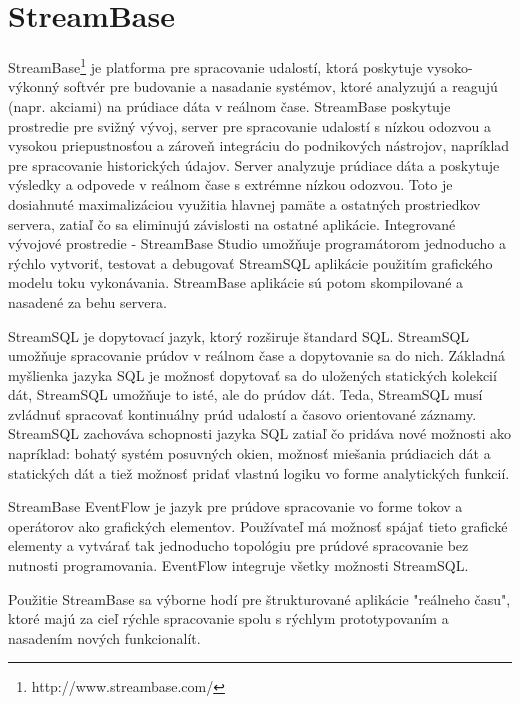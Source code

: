 \section{StreamBase}
StreamBase\footnote{http://www.streambase.com/} je platforma pre spracovanie udalostí, ktorá poskytuje vysoko-výkonný softvér pre budovanie a nasadanie systémov, ktoré analyzujú a reagujú (napr. akciami) na prúdiace dáta v reálnom čase. StreamBase poskytuje prostredie pre svižný vývoj, server pre spracovanie udalostí s nízkou odozvou a vysokou priepustnosťou a zároveň integráciu do podnikových nástrojov, napríklad pre spracovanie historických údajov. Server analyzuje prúdiace dáta a poskytuje výsledky a odpovede v reálnom čase s extrémne nízkou odozvou. Toto je dosiahnuté maximalizáciou využitia hlavnej pamäte a ostatných prostriedkov servera, zatiaľ čo sa eliminujú závislosti na ostatné aplikácie. Integrované vývojové prostredie - StreamBase Studio umožňuje programátorom jednoducho a rýchlo vytvoriť, testovat a debugovať StreamSQL aplikácie použitím grafického modelu toku vykonávania. StreamBase aplikácie sú potom skompilované a nasadené za behu servera.
\par
StreamSQL je dopytovací jazyk, ktorý rozširuje štandard SQL. StreamSQL umožňuje spracovanie prúdov v reálnom čase a dopytovanie sa do nich. Základná myšlienka jazyka SQL je možnosť dopytovať sa do uložených statických kolekcií dát, StreamSQL umožňuje to isté, ale do prúdov dát. Teda, StreamSQL musí zvládnuť spracovať kontinuálny prúd udalostí a časovo orientované záznamy. StreamSQL zachováva schopnosti jazyka SQL zatiaľ čo pridáva nové možnosti ako napríklad: bohatý systém posuvných okien, možnosť miešania prúdiacich dát a statických dát a tiež možnosť pridať vlastnú logiku vo forme analytických funkcií. 
\par
StreamBase EventFlow je jazyk pre prúdove spracovanie vo forme tokov a operátorov ako grafických elementov. Používateľ má možnosť spájať tieto grafické elementy a vytvárať tak jednoducho topológiu pre prúdové spracovanie bez nutnosti programovania. EventFlow integruje všetky možnosti StreamSQL.
\par
Použitie StreamBase sa výborne hodí pre štrukturované aplikácie "reálneho času", ktoré majú za cieľ rýchle spracovanie spolu s rýchlym prototypovaním a nasadením nových funkcionalít.
\label{fig:streambase}

